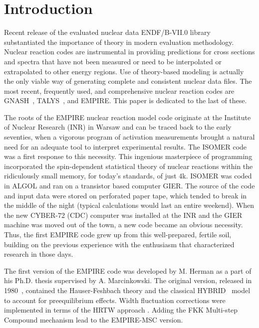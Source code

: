 \newpage

\section{Introduction}

Recent release of the evaluated nuclear data ENDF/B-VII.0 library~\cite%
{ENDF-VII} substantiated the importance of theory in modern evaluation
methodology. Nuclear reaction codes are instrumental in providing
predictions for cross sections and spectra that have not been measured or
need to be interpolated or extrapolated to other energy regions. Use of
theory-based modeling is actually the only viable way of generating
complete and consistent nuclear data files. The most recent, frequently
used, and comprehensive nuclear reaction codes are GNASH~\cite{Young:77,
Young:92, Young:98}, TALYS~\cite{TALYS}, and EMPIRE. This paper is dedicated
to the last of these.

The roots of the EMPIRE nuclear reaction model code originate at the Institute
of Nuclear Research (INR) in Warsaw and can be traced back to the early
seventies, when a vigorous program of activation measurements brought a
natural need for an adequate tool to interpret experimental results. The
ISOMER code~\cite{Grochulski:73} was a first response to this necessity.
This ingenious masterpiece of programming incorporated the spin-dependent
statistical theory of nuclear reactions within the ridiculously small
memory, for
today's standards, of just 4k. ISOMER was coded in ALGOL and ran
on a transistor based computer GIER. The source of the code and input data
were stored on perforated paper tape, which tended to break in the middle
of the night (typical calculations would last an entire weekend). When the new
CYBER-72 (CDC) computer was installed at the INR and the GIER machine was moved
out of the town, a new code became an obvious necessity. Thus, the first
EMPIRE code grew up from this well-prepared, fertile soil, building on the
previous experience with the enthusiasm that characterized research in those
days.

The first version of the EMPIRE code was developed by M. Herman as a part of
his Ph.D. thesis supervised by A. Marcinkowski. The original version,
released in 1980~\cite{EMPIRE-I}, contained the Hauser-Feshbach theory and
the classical HYBRID~\cite{hybrid, hybrid1, hybrid2, hybrid3} model to
account for preequilibrium effects. Width fluctuation corrections were
implemented in terms of the HRTW approach \cite{HRTW,HHM}. Adding the FKK
Multi-step Compound mechanism \cite{FKK} lead to the EMPIRE-MSC version.

